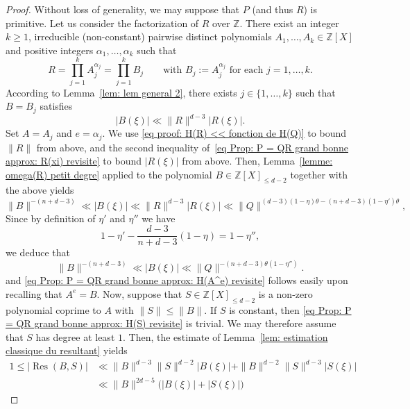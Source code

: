 \documentclass[JEP,XML,SOM,Unicode,NoFloatCountersInSection,published]{cedram}
\DeclareMathOperator\Res{Res}
\newcommand\bZ{\mathbb{Z}}
\newcommand{\normH}[1]{\|#1\|}
\theoremstyle{definition}
\theoremstyle{plain}
\begin{document}
\begin{proof}
Without loss of generality, we may suppose that $P$ (and thus $R$) is primitive. Let us consider the factorization of $R$ over $\bZ$. There exist an integer $k\geq 1$, irreducible (non-constant) pairwise distinct polynomials $A_1,\dots,A_k\in\bZ[X]$ and positive integers $\alpha_1,\dots,\alpha_k$ such that
\[
R = \prod_{j=1}^{k} A_j^{\alpha_j} = \prod_{j=1}^{k} B_j \qquad \textrm{with $B_j:= A_j^{\alpha_j}$ for each $j=1,\dots,k$}.
\]
According to Lemma~\ref{lem: lem general 2}, there exists $j\in\{1,\dots,k\}$ such that $B = B_j$ satisfies
\begin{equation*}
|B(\xi)| \ll \normH{R}^{d-3}|R(\xi)|.
\end{equation*}
Set $A=A_j$ and $e=\alpha_j$. We use \eqref{eq proof: H(R) << fonction de H(Q)} to bound $\normH{R}$ from above, and the second inequality of~\eqref{eq Prop: P = QR grand bonne approx: R(xi) revisite} to bound $|R(\xi)|$ from above. Then, Lemma~\ref{lemme: omega(R) petit degre} applied to the polynomial $B\in\bZ[X]_{\leq d-2}$ together with the above yields
\begin{equation*}
\normH{B}^{-(n+d-3)} \ll |B(\xi)| \ll \normH{R}^{d-3}|R(\xi)| \ll \normH{Q}^{(d-3)(1-\eta)\theta-(n+d-3)(1-\eta')\theta},
\end{equation*}
Since by definition of $\eta'$ and $\eta''$ we have
\begin{equation*}
1-\eta'-\frac{d-3}{n+d-3}(1-\eta) = 1-\eta'',
\end{equation*}
we deduce that
\begin{equation}
\label{eq proof: B(xi) << fonction de H(Q)}
\normH{B}^{-(n+d-3)} \ll |B(\xi)| \ll \normH{Q}^{-(n+d-3)\theta(1-\eta'')}.
\end{equation}
and \eqref{eq Prop: P = QR grand bonne approx: H(A^e) revisite} follows easily upon recalling that $A^e = B$. Now, suppose that $S\in\bZ[X]_{\leq d-2}$ is a non-zero polynomial coprime to $A$ with $\normH{S}\leq \normH{B}$. If $S$ is constant, then \eqref{eq Prop: P = QR grand bonne approx: H(S) revisite} is trivial. We may therefore assume that $S$ has degree at least $1$. Then, the estimate of Lemma~\ref{lem: estimation classique du resultant} yields
\begin{equation}
\begin{aligned}
1 \leq |\Res(B,S)| & \ll \normH{B}^{d-3}\normH{S}^{d-2}|B(\xi)| + \normH{B}^{d-2}\normH{S}^{d-3}|S(\xi)| \\
& \ll \normH{B}^{2d-5}\big(|B(\xi)|+|S(\xi)| \big) \label{eq proof: estimation resultant}
\end{aligned}

\end{equation}
\end{proof}
\end{document}

